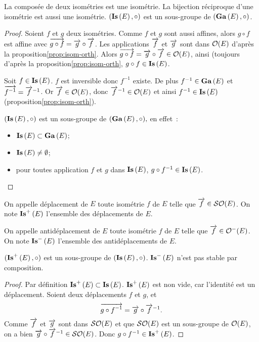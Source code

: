 \begin{prop}
  La composée de deux isométries est une isométrie. La bijection réciproque 
  d'une isométrie est aussi une isométrie. \((\mathbf{Is}\left(E\right), \circ)\) est un 
  sous-groupe de \((\mathbf{Ga}\left(E\right), \circ)\).
\end{prop}
\begin{proof}
  Soient \(f\) et \(g\) deux isométries. Comme \(f\) et \(g\) sont aussi 
  affines, alors \(g \circ f\) est affine avec \(\overrightarrow{g \circ f}=\overrightarrow{g} \circ 
  \overrightarrow{f}\). Les applications \(\overrightarrow{f}\) et \(\overrightarrow{g}\) sont dans 
  \(\mathcal{O}\!\left(E\right)\) d'après la proposition\ref{prop:isom-orth}. Alors \(\overrightarrow{g \circ f}=\overrightarrow{g} \circ \overrightarrow{f} \in 
  \mathcal{O}\!\left(E\right)\), ainsi (toujours d'après la proposition\ref{prop:isom-orth}, \(g \circ f \in \mathbf{Is}\left(E\right)\).

  Soit \(f \in \mathbf{Is}\left(E\right)\). \(f\) est inversible donc \(f^{-1}\) existe. De plus 
  \(f^{-1} \in \mathbf{Ga}\left(E\right)\) et \(\overrightarrow{f^{-1}}=\overrightarrow{f}^{-1}\). Or \(\overrightarrow{f} \in 
  \mathcal{O}\!\left(E\right)\), donc \(\overrightarrow{f}^{-1} \in \mathcal{O}\!\left(E\right)\) et ainsi \(f^{-1} \in \mathbf{Is}\left(E\right)\) 
  (proposition\ref{prop:isom-orth}).

  \((\mathbf{Is}\left(E\right), \circ)\) est un sous-groupe de \((\mathbf{Ga}\left(E\right), \circ),\) en effet~:
  \begin{itemize}
    \item \(\mathbf{Is}\left(E\right) \subset \mathbf{Ga}\left(E\right)\);
    \item \(\mathbf{Is}\left(E\right) \neq \emptyset\);
    \item pour toutes application \(f\) et \(g\) dans \(\mathbf{Is}\left(E\right)\), \(g \circ 
      f^{-1} \in \mathbf{Is}\left(E\right)\).
  \end{itemize}
\end{proof}

\begin{defdef}
  On appelle déplacement de \(E\) toute isométrie \(f\) de \(E\) telle que 
  \(\overrightarrow{f} \in \mathcal{SO}\!\left(E\right)\). On note \(\mathbf{Is}^{+}\left(E\right)\) l'ensemble des déplacements 
  de \(E\).

  On appelle antidéplacement de \(E\) toute isométrie \(f\) de \(E\) telle que 
  \(\overrightarrow{f} \in \mathcal{O}^{-}\!\left(E\right)\). On note \(\mathbf{Is}^{-}\left(E\right)\) l'ensemble des 
  antidéplacements de \(E\).
\end{defdef}

\begin{prop}
  \((\mathbf{Is}^{+}\left(E\right), \circ)\) est un sous-groupe de \((\mathbf{Is}\left(E\right), \circ)\). 
  \(\mathbf{Is}^{-}\left(E\right)\) n'est pas stable par composition.
\end{prop}
\begin{proof}
  Par définition \(\mathbf{Is}^{+}\left(E\right) \subset \mathbf{Is}\left(E\right)\). \(\mathbf{Is}^{+}\left(E\right)\) est non vide, car 
  l'identité est un déplacement. Soient deux déplacements \(f\) et \(g\), et
  \begin{equation}
    \overrightarrow{g \circ f^{-1}}=\overrightarrow{g} \circ \overrightarrow{f}^{-1}.
  \end{equation}
  Comme \(\overrightarrow{f}\) et \(\overrightarrow{g}\) sont dans \(\mathcal{SO}\!\left(E\right)\) et que 
  \(\mathcal{SO}\!\left(E\right)\) est un sous-groupe de \(\mathcal{O}\!\left(E\right)\), on a bien \(\overrightarrow{g} \circ 
  \overrightarrow{f}^{-1} \in \mathcal{SO}\!\left(E\right)\). Donc \(g \circ f^{-1} \in \mathbf{Is}^{+}\left(E\right)\).
\end{proof}

